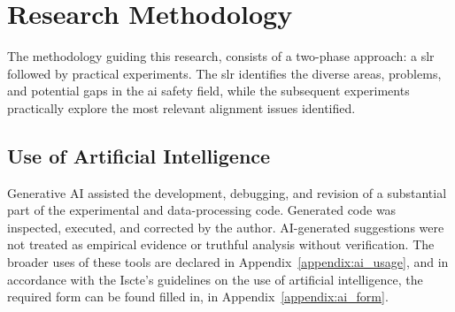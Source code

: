 \chapter{Research Methodology}\label{research_methodology}



	The methodology guiding this research, consists of a two-phase approach: a \gls{slr} followed by practical experiments. The \gls{slr} identifies the diverse areas, problems, and potential gaps in the \gls{ai} safety field, while the subsequent experiments practically explore the most relevant alignment issues identified.
	




\section{Use of Artificial Intelligence}
\label{sec:ai_methodology}

Generative AI assisted the development, debugging, and revision of a substantial part of the experimental and data-processing code. Generated code was inspected, executed, and corrected by the author. AI-generated suggestions were not treated as empirical evidence or truthful analysis without verification. The broader uses of these tools are declared in Appendix~\ref{appendix:ai_usage}, and in accordance with the Iscte's guidelines on the use of artificial intelligence, the required form can be found filled in, in Appendix~\ref{appendix:ai_form}.





